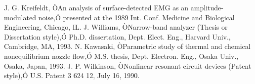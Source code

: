  J. G. Kreifeldt, ÒAn analysis of surface-detected EMG as an amplitude-modulated noise,Ó presented at the 1989 Int. Conf. Medicine and Biological Engineering, Chicago, IL.
 J. Williams, ÒNarrow-band analyzer (Thesis or Dissertation style),Ó Ph.D. dissertation, Dept. Elect. Eng., Harvard Univ., Cambridge, MA, 1993. 
 N. Kawasaki, ÒParametric study of thermal and chemical nonequilibrium nozzle flow,Ó M.S. thesis, Dept. Electron. Eng., Osaka Univ., Osaka, Japan, 1993.
 J. P. Wilkinson, ÒNonlinear resonant circuit devices (Patent style),Ó U.S. Patent 3 624 12, July 16, 1990. 







